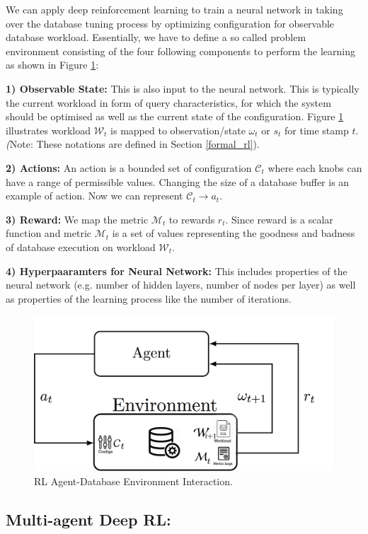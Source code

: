 We can apply deep reinforcement learning to train a neural network in taking
over the database tuning process by optimizing configuration for observable database workload.
Essentially, we have to define a so called problem environment
consisting of the four following components to perform the learning as shown in Figure \ref{fig:database_agent}:


\textbf{1) Observable State:} This is also input to the neural network. This is typically the current workload in form of
query characteristics, for which the system should be optimised as well as the current state
of the configuration. Figure \ref{fig:database_agent} illustrates workload $\mathcal{W}_t$ is mapped to observation/state $\omega_t$ or $s_t$ for time stamp $t$.\\
\textit(Note: These notations are defined in Section \ref{formal_rl}).

\textbf{2) Actions:} An action is a bounded set of configuration $\mathcal{C}_t$ where each knobs can have a range of permissible values.
Changing the size of a database buffer is an example of action. Now we can represent $\mathcal{C}_t  \rightarrow a_t$.

\textbf{3) Reward:}
We map the metric $\mathcal{M}_t$ to rewards $r_t$. Since reward is a scalar function and metric $\mathcal{M}_t$ is a set of values representing the goodness and badness of database execution on workload $\mathcal{W}_t$.

\textbf{4) Hyperpaaramters for Neural Network:}
This includes properties of
the neural network (e.g. number of hidden layers, number of nodes per layer) as well as
properties of the learning process like the number of iterations.





\begin{figure}[t]
	\includegraphics[width=0.9\linewidth ]{fig/database_agent.png}
    \vspace{-2mm}
    \caption{RL Agent-Database Environment Interaction.}
    \label{fig:database_agent}
\end{figure}


\subsection*{Multi-agent Deep RL:}







